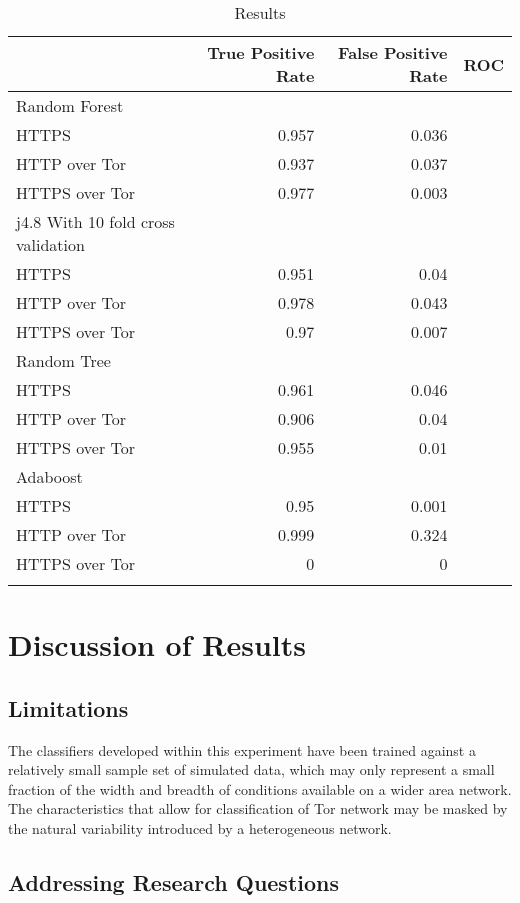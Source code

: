 \documentclass{ecuthesis}
\begin{document}
\begin{table}
  \begin{tabular}{lrrr}
    \toprule
    & True Positive Rate & False Positive Rate & ROC \\
    \midrule
    Random Forest\\
    \midrule
    HTTPS & 0.957 & 0.036\\
    HTTP over Tor & 0.937 & 0.037\\
    HTTPS over Tor & 0.977 & 0.003\\
    \midrule
    j4.8 With 10 fold cross validation\\
    \midrule
    HTTPS & 0.951 & 0.04\\
    HTTP over Tor & 0.978 & 0.043\\
    HTTPS over Tor & 0.97 & 0.007\\
    \midrule
    Random Tree\\
    \midrule
    HTTPS & 0.961 & 0.046\\
    HTTP over Tor & 0.906 & 0.04\\
    HTTPS over Tor & 0.955 & 0.01\\
    \midrule
    Adaboost\\
    \midrule
    HTTPS & 0.95 & 0.001\\
    HTTP over Tor & 0.999 & 0.324\\
    HTTPS over Tor & 0 & 0\\
    \bottomrule
    \label{table:results}
  \end{tabular}
  \caption{Results}
\end{table}

\chapter{Discussion of Results}

\section{Limitations}

The classifiers developed within this experiment have been trained against
a relatively small sample set of simulated data, which may only represent
a small fraction of the width and breadth of conditions available on a wider
area network. The characteristics that allow for classification of Tor network
may be masked by the natural variability introduced by a heterogeneous network.

\section{Addressing Research Questions}
\end{document}
